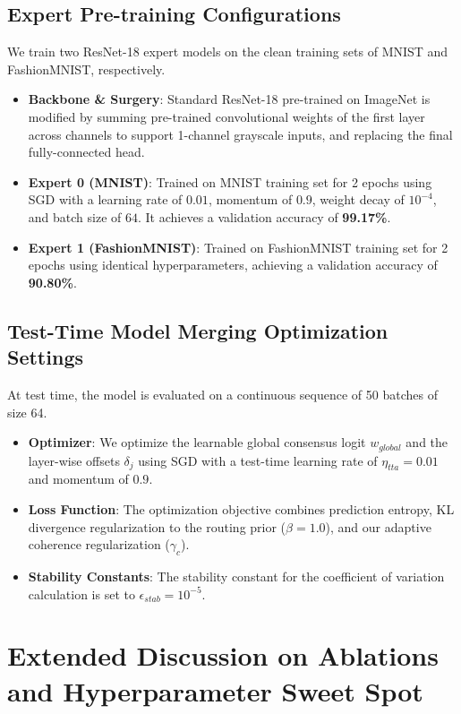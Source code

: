 \documentclass{article}
\theoremstyle{plain}
\theoremstyle{definition}
\theoremstyle{remark}
\begin{document}
\subsection{Expert Pre-training Configurations}
We train two ResNet-18 expert models on the clean training sets of MNIST and FashionMNIST, respectively.
\begin{itemize}
    \item \textbf{Backbone \& Surgery}: Standard ResNet-18 pre-trained on ImageNet is modified by summing pre-trained convolutional weights of the first layer across channels to support 1-channel grayscale inputs, and replacing the final fully-connected head.
    \item \textbf{Expert 0 (MNIST)}: Trained on MNIST training set for 2 epochs using SGD with a learning rate of $0.01$, momentum of $0.9$, weight decay of $10^{-4}$, and batch size of $64$. It achieves a validation accuracy of \textbf{99.17\%}.
    \item \textbf{Expert 1 (FashionMNIST)}: Trained on FashionMNIST training set for 2 epochs using identical hyperparameters, achieving a validation accuracy of \textbf{90.80\%}.
\end{itemize}

\subsection{Test-Time Model Merging Optimization Settings}
At test time, the model is evaluated on a continuous sequence of 50 batches of size 64. 
\begin{itemize}
    \item \textbf{Optimizer}: We optimize the learnable global consensus logit $w_{global}$ and the layer-wise offsets $\delta_j$ using SGD with a test-time learning rate of $\eta_{tta} = 0.01$ and momentum of $0.9$.
    \item \textbf{Loss Function}: The optimization objective combines prediction entropy, KL divergence regularization to the routing prior ($\beta = 1.0$), and our adaptive coherence regularization ($\gamma_c$).
    \item \textbf{Stability Constants}: The stability constant for the coefficient of variation calculation is set to $\epsilon_{stab} = 10^{-5}$.
\end{itemize}

\section{Extended Discussion on Ablations and Hyperparameter Sweet Spot}
\label{sec:appendix_ablations}
\end{document}

